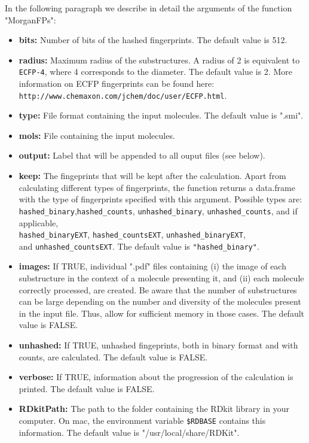 \documentclass[twoside,a4wide,12pt]{article}\usepackage[]{graphicx}\usepackage[]{color}
\begin{document}
In the following paragraph we describe in detail the arguments of the function "MorganFPs":
\begin{itemize}
\item {\bf bits:} Number of bits of the hashed fingerprints. The default value is 512.
\item {\bf radius:} Maximum radius of the substructures. A radius of 2 is equivalent to \verb|ECFP-4|, where 4 corresponds to the diameter. The default value is 2.
More information on ECFP fingerprints can be found here:\\
\verb|http://www.chemaxon.com/jchem/doc/user/ECFP.html|.
\item {\bf type:} File format containing the input molecules. The default value is ".smi".
\item {\bf mols:} File containing the input molecules.
\item {\bf output:} Label that will be appended to all ouput files (see below).
\item {\bf keep:} The fingeprints that will be kept after the calculation.
Apart from calculating different types of fingerprints, the function returns a data.frame with the type of fingerprints specified with this argument.  Possible types are: \verb|hashed_binary|,\verb|hashed_counts|, \verb|unhashed_binary|, \verb|unhashed_counts|, and if applicable,\\
\verb|hashed_binaryEXT|, \verb|hashed_countsEXT|, \verb|unhashed_binaryEXT|,\\
and \verb|unhashed_countsEXT|.
The default value is \verb|"hashed_binary"|.
\item {\bf images:} If TRUE, individual ".pdf" files containing (i) the image of each substructure in the context of a molecule presenting it, and (ii) each molecule correctly processed, are created.  Be aware that the number of substructures can be large depending on the number and diversity of the molecules present in the input file. Thus, allow for sufficient memory in those cases.
The default value is FALSE.
\item {\bf unhashed:} If TRUE, unhashed fingeprints, both in binary format and with counts, are calculated. The default value is FALSE.
\item {\bf verbose:} If TRUE, information about the progression of the calculation is printed. The default value is FALSE.
\item {\bf RDkitPath:} The path to the folder containing the RDkit library in your computer. On mac, the environment variable \verb|$RDBASE| contains this information. The default value is "/usr/local/share/RDKit".

\end{itemize}
\end{document}
